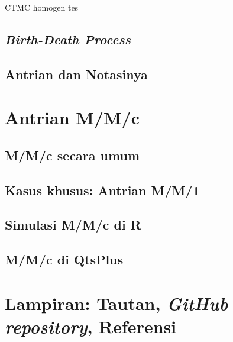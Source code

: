 \documentclass{beamer}
\begin{document}
\begin{frame}{CTMC homogen}
    tes
\end{frame}

\subsection{\textit{Birth-Death Process}}

\subsection{Antrian dan Notasinya}

\section{Antrian M/M/c}

\subsection{M/M/c secara umum}

\subsection{Kasus khusus: Antrian M/M/1}

\subsection{Simulasi M/M/c di R}

\subsection{M/M/c di QtsPlus}

\section{Lampiran: Tautan, \textit{GitHub repository}, Referensi}
\end{document}
